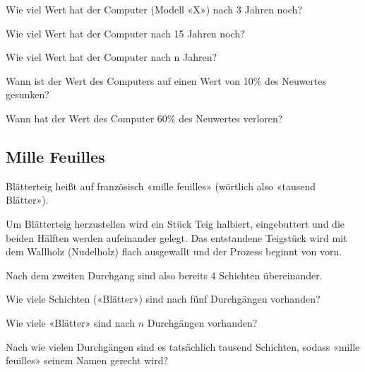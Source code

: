 \begin{bbwAufgabenBlock}
\item  Wie viel Wert hat der Computer (Modell «X») nach 3 Jahren
noch?  \plz{}
\item Wie viel Wert hat der Computer nach 15 Jahren noch?  \plz{}
\item Wie viel Wert hat der Computer nach n Jahren?  \plz{} \noTRAINER{\newpage}
\item Wann ist der Wert des Computers auf einen Wert von 10\% des
Neuwertes gesunken?  \plz{}
\item Wann hat der Wert des Computer 60\% des Neuwertes
verloren?  \plz{}
\end{bbwAufgabenBlock}

\platzFuerBerechnungenBisEndeSeite{}
\subsection{Mille Feuilles}
Blätterteig heißt auf französisch «mille feuilles» (wörtlich also
«tausend Blätter»).

Um Blätterteig herzustellen wird ein Stück Teig halbiert, eingebuttert
und die beiden Hälften werden aufeinander gelegt. Das entstandene
Teigstück wird mit dem Wallholz (Nudelholz) flach ausgewallt und der
Prozess beginnt von vorn.

Nach dem zweiten Durchgang sind also bereits 4 Schichten übereinander.

\begin{bbwAufgabenBlock}
\item Wie viele Schichten («Blätter») sind nach fünf Durchgängen
vorhanden?  \plz{}

\item Wie viele «Blätter» sind nach $n$ Durchgängen
vorhanden?  \plz{}

\item Nach wie vielen Durchgängen sind es tatsächlich tausend
Schichten, sodass «mille feuilles» seinem Namen gerecht
wird? 

\end{bbwAufgabenBlock}

